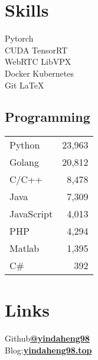 \documentclass[]{deedy-resume-openfont}
\begin{document}
\begin{minipage}[t]{0.22\textwidth}
\section{Skills}
Pytorch \\
CUDA \textbullet{} TensorRT \\
WebRTC \textbullet{} LibVPX \\
Docker \textbullet{} Kubernetes \\
Git \textbullet{} \LaTeX \\

\subsection{Programming }
\begin{tabular}{lr}
    Python     & 23,963 \\ %
    Golang 	   & 20,812 \\ %
    C/C++      & 8,478  \\ %
    Java       & 7,309  \\ %
    JavaScript & 4,013  \\ %
    PHP        & 4,294  \\ %
    Matlab     & 1,395  \\ %
    C\#        & 392    \\ %
\end{tabular}
\sectionsep

\section{Links}
Github\href{https://github.com/yindaheng98}{\bf @yindaheng98} \\
Blog:\href{http://www.yindaheng98.top}{\bf yindaheng98.top} \\
\sectionsep

\end{minipage} 
\hfill
\end{document}
